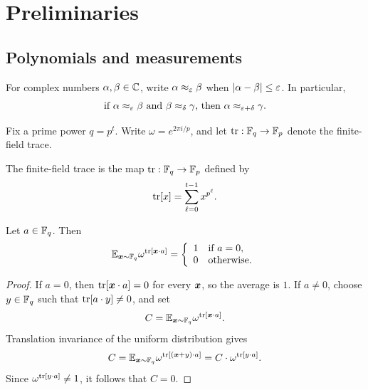 \chapter{Preliminaries}
\label{chap:preliminaries}
\label{sec:prelims}

\section{Polynomials and measurements}

For complex numbers $\alpha,\beta \in \mathbb{C}$, write $\alpha \approx_\varepsilon \beta$ when $|\alpha-\beta|\le \varepsilon$. In particular,
\begin{equation}\label{eq:triangle-inequality-for-numbers}
	\text{if $\alpha \approx_{\varepsilon} \beta$ and $\beta \approx_{\delta} \gamma$, then $\alpha \approx_{\varepsilon+\delta}\gamma$.}
\end{equation}

Fix a prime power $q=p^t$. Write $\omega=e^{2\pi i/p}$, and let $\operatorname{tr}:\mathbb{F}_q\to\mathbb{F}_p$ denote the finite-field trace.

\begin{definition}\label{def:ff-trace}
	\leanok
	The finite-field trace is the map $\operatorname{tr}:\mathbb{F}_q\to\mathbb{F}_p$ defined by
	\[
		\operatorname{tr}[x] = \sum_{\ell=0}^{t-1} x^{p^\ell}.
	\]
\end{definition}

\begin{lemma}\label{prop:fourier-fact-scalar}
	\leanok
	Let $a \in \mathbb{F}_q$. Then
	\begin{equation*}
		\mathbb{E}_{{\boldsymbol{x}} \sim \mathbb{F}_q} \omega^{\operatorname{tr}[{\boldsymbol{x}} \cdot a]}
		= \left\{\begin{array}{rl}
			1 & \text{if $a = 0$}, \\
			0 & \text{otherwise}.
		\end{array}\right.
	\end{equation*}
\end{lemma}
\begin{proof}
	\leanok
	If $a=0$, then $\operatorname{tr}[{\boldsymbol{x}}\cdot a]=0$ for every ${\boldsymbol{x}}$, so the average is $1$. If $a\neq 0$, choose $y \in \mathbb{F}_q$ such that $\operatorname{tr}[a\cdot y]\neq 0$, and set
	\[
		C=\mathbb{E}_{{\boldsymbol{x}} \sim \mathbb{F}_q} \omega^{\operatorname{tr}[{\boldsymbol{x}} \cdot a]}.
	\]
	Translation invariance of the uniform distribution gives
	\[
		C=\mathbb{E}_{{\boldsymbol{x}} \sim \mathbb{F}_q} \omega^{\operatorname{tr}[({\boldsymbol{x}}+y)\cdot a]}
		= C \cdot \omega^{\operatorname{tr}[y\cdot a]}.
	\]
	Since $\omega^{\operatorname{tr}[y\cdot a]}\neq 1$, it follows that $C=0$.
\end{proof}

